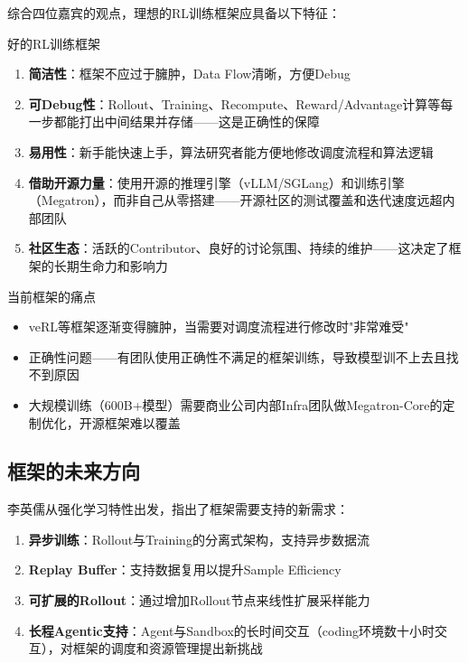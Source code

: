 综合四位嘉宾的观点，理想的RL训练框架应具备以下特征：

\begin{importantbox}{好的RL训练框架}
\begin{enumerate}
    \item \textbf{简洁性}：框架不应过于臃肿，Data Flow清晰，方便Debug
    \item \textbf{可Debug性}：Rollout、Training、Recompute、Reward/Advantage计算等每一步都能打出中间结果并存储——这是正确性的保障
    \item \textbf{易用性}：新手能快速上手，算法研究者能方便地修改调度流程和算法逻辑
    \item \textbf{借助开源力量}：使用开源的推理引擎（vLLM/SGLang）和训练引擎（Megatron），而非自己从零搭建——开源社区的测试覆盖和迭代速度远超内部团队
    \item \textbf{社区生态}：活跃的Contributor、良好的讨论氛围、持续的维护——这决定了框架的长期生命力和影响力
\end{enumerate}
\end{importantbox}

\begin{warningbox}{当前框架的痛点}
\begin{itemize}
    \item veRL等框架逐渐变得臃肿，当需要对调度流程进行修改时"非常难受"
    \item 正确性问题——有团队使用正确性不满足的框架训练，导致模型训不上去且找不到原因
    \item 大规模训练（600B+模型）需要商业公司内部Infra团队做Megatron-Core的定制优化，开源框架难以覆盖
\end{itemize}
\end{warningbox}

\subsection{框架的未来方向}

李英儒从强化学习特性出发，指出了框架需要支持的新需求：

\begin{enumerate}
    \item \textbf{异步训练}：Rollout与Training的分离式架构，支持异步数据流
    \item \textbf{Replay Buffer}：支持数据复用以提升Sample Efficiency
    \item \textbf{可扩展的Rollout}：通过增加Rollout节点来线性扩展采样能力
    \item \textbf{长程Agentic支持}：Agent与Sandbox的长时间交互（coding环境数十小时交互），对框架的调度和资源管理提出新挑战
\end{enumerate}

